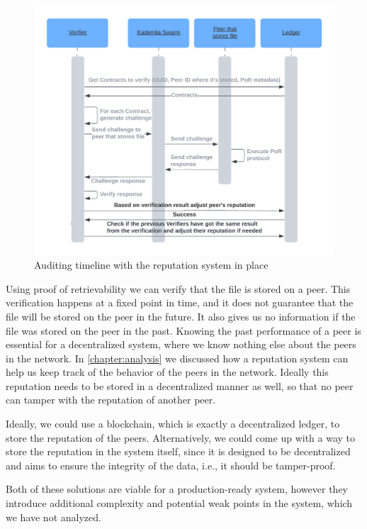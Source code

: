 \begin{figure}
    \centering
    \includegraphics[width=1\textwidth]{gfx/verify-reputation.png}
    \caption{Auditing timeline with the reputation system in place}
    \label{fig:audit-reputation}
\end{figure}

Using proof of retrievability we can verify that the file is stored on a peer.
This verification happens at a fixed point in time,
and it does not guarantee that the file will be stored on the peer in the future.
It also gives us no information if the file was stored on the peer in the past.
Knowing the past performance of a peer is essential for a decentralized system,
where we know nothing else about the peers in the network.
In \autoref{chapter:analysis} we discussed how a reputation system can help us keep track
of the behavior of the peers in the network.
Ideally this reputation needs to be stored in a decentralized manner as well,
so that no peer can tamper with the reputation of another peer.

Ideally, we could use a blockchain, which is exactly a decentralized ledger,
to store the reputation of the peers.
Alternatively, we could come up with a way to store the reputation in the system itself,
since it is designed to be decentralized and aims to ensure the integrity of the data,
i.e., it should be tamper-proof.

Both of these solutions are viable for a production-ready system,
however they introduce additional complexity and potential weak points in the system,
which we have not analyzed.


